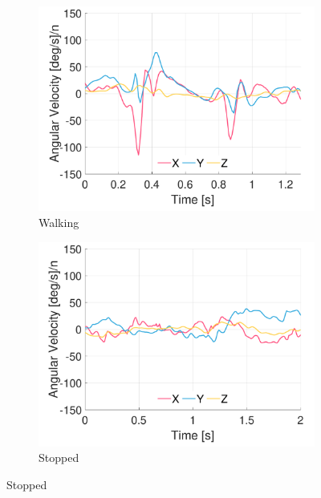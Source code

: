 \begin{figure}[p]
\centering
    \begin{subfigure}[b]{0.49\textwidth}
         \centering
         \includegraphics[width=\textwidth]{content/3-Methods/example-data/ch3_example_data_subject_01_chest_gyro_activity_walking.pdf}
         \caption{Walking}
    \end{subfigure}
    \begin{subfigure}[b]{0.49\textwidth}
         \centering
         \includegraphics[width=\textwidth]{content/3-Methods/example-data/ch3_example_data_subject_01_chest_gyro_activity_stop.pdf}
         \caption{Stopped}
    \end{subfigure}
    

\end{figure}
